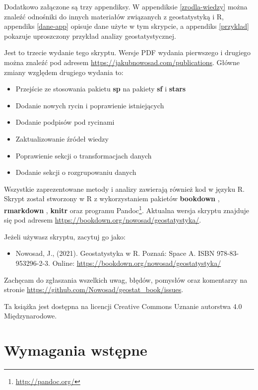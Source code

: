 \documentclass[
  paper=6in:9in,pagesize=pdftex,headinclude=on,footinclude=on,10pt]{scrbook}
\providecommand{\tightlist}{%
  \setlength{\itemsep}{0pt}\setlength{\parskip}{0pt}}
\renewcommand{\href}[2]{#2 (\url{#1})}
\renewcommand{\href}[2]{#2\footnote{\url{#1}}}
\begin{document}
Dodatkowo załączone są trzy appendiksy.
W appendiksie \ref{zrodla-wiedzy} można znaleźć odnośniki do innych materiałów związanych z geostatystyką i R, appendiks \ref{dane-app} opisuje dane użyte w tym skrypcie, a appendiks \ref{przyklad} pokazuje uproszczony przykład analizy geostatystycznej.

Jest to trzecie wydanie tego skryptu.
Wersje PDF wydania pierwszego i drugiego można znaleźć pod adresem \url{https://jakubnowosad.com/publications}.
Główne zmiany względem drugiego wydania to:

\begin{itemize}
\tightlist
\item
  Przejście ze stosowania pakietu \textbf{sp} na pakiety \textbf{sf} i \textbf{stars}
\item
  Dodanie nowych rycin i poprawienie istniejących
\item
  Dodanie podpisów pod rycinami
\item
  Zaktualizowanie źródeł wiedzy
\item
  Poprawienie sekcji o transformacjach danych
\item
  Dodanie sekcji o rozgrupowaniu danych
\end{itemize}

Wszystkie zaprezentowane metody i analizy zawierają również kod w języku R.
Skrypt został stworzony w R \citep{R-base} z wykorzystaniem pakietów \textbf{bookdown} \citep{R-bookdown}, \textbf{rmarkdown} \citep{R-rmarkdown}, \textbf{knitr} \citep{R-knitr} oraz programu \href{http://pandoc.org/}{Pandoc}.
Aktualna wersja skryptu znajduje się pod adresem \url{https://bookdown.org/nowosad/geostatystyka/}.

Jeżeli używasz skryptu, zacytuj go jako:

\begin{itemize}
\tightlist
\item
  Nowosad, J., (2021). Geostatystyka w R. Poznań: Space A. ISBN 978-83-953296-2-3. Online:
  \url{https://bookdown.org/nowosad/geostatystyka/}
\end{itemize}

Zachęcam do zgłaszania wszelkich uwag, błędów, pomysłów oraz komentarzy na stronie \url{https://github.com/Nowosad/geostat_book/issues}.

Ta książka jest dostępna na licencji Creative Commons Uznanie autorstwa 4.0 Międzynarodowe.

\section*{Wymagania wstępne}\label{wymagania-wstux119pne}
\end{document}
